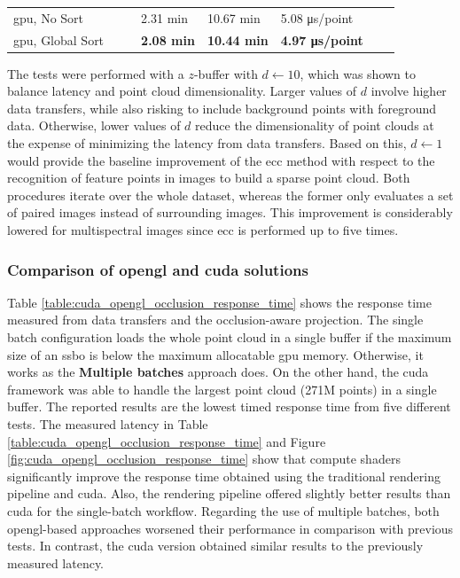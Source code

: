 \begin{table}
\begin{tabular}{l@{\hskip 0.06in}|lll|l|l|l|l}
    \acrshort{gpu}, No Sort & & & 2.31 \si{\minute} & 10.67 \si{\minute} & 5.08 \si{\micro\second}/point & &\\
    \acrshort{gpu}, Global Sort & & & \textbf{2.08 \si{\minute}} & \textbf{10.44 \si{\minute}} & \textbf{4.97 \si{\micro\second}/point} & &\\
    \bottomrule
    \end{tabular}
\end{table}
\renewcommand{\arraystretch}{1}

The tests were performed with a $z$-buffer with $d \gets 10$, which was shown to balance latency and point cloud dimensionality. Larger values of $d$ involve higher data transfers, while also risking to include background points with foreground data. Otherwise, lower values of $d$ reduce the dimensionality of point clouds at the expense of minimizing the latency from data transfers. Based on this, $d \gets 1$ would provide the baseline improvement of the \acrshort{ecc} method with respect to the recognition of feature points in images to build a sparse point cloud. Both procedures iterate over the whole dataset, whereas the former only evaluates a set of paired images instead of surrounding images. This improvement is considerably lowered for multispectral images since \acrshort{ecc} is performed up to five times. 

\subsubsection{Comparison of \acrshort{opengl} and \acrshort{cuda} solutions}

Table \ref{table:cuda_opengl_occlusion_response_time} shows the response time measured from data transfers and the occlusion-aware projection. The single batch configuration loads the whole point cloud in a single buffer if the maximum size of an \acrshort{ssbo} is below the maximum allocatable \acrshort{gpu} memory. Otherwise, it works as the \textbf{Multiple batches} approach does. On the other hand, the \acrshort{cuda} framework was able to handle the largest point cloud (271M points) in a single buffer. The reported results are the lowest timed response time from five different tests. The measured latency in Table \ref{table:cuda_opengl_occlusion_response_time} and Figure \ref{fig:cuda_opengl_occlusion_response_time} show that compute shaders significantly improve the response time obtained using the traditional rendering pipeline and \acrshort{cuda}. Also, the rendering pipeline offered slightly better results than \acrshort{cuda} for the single-batch workflow. Regarding the use of multiple batches, both \acrshort{opengl}-based approaches worsened their performance in comparison with previous tests. In contrast, the \acrshort{cuda} version obtained similar results to the previously measured latency. 

